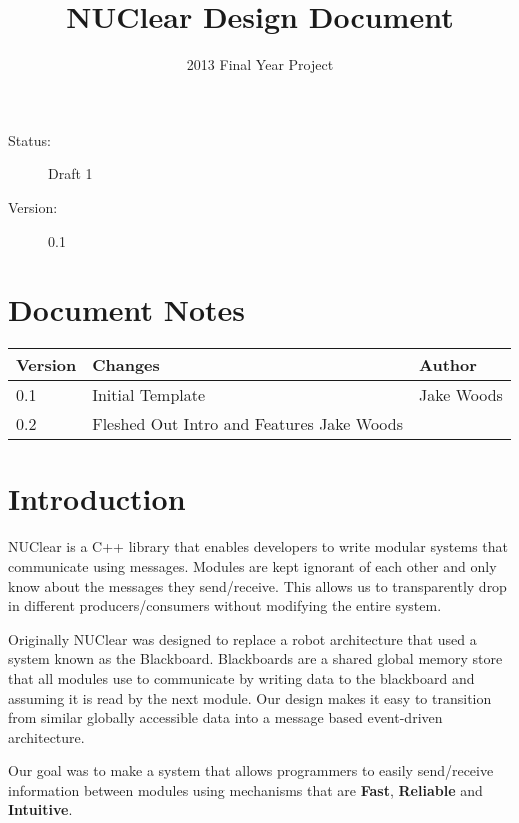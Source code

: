 \documentclass[english,12pt]{scrartcl}
\title{NUClear Design Document}
\author{2013 Final Year Project}
\begin{document}
	\maketitle
	\vfill
	{\large
		\begin{description}
			\item [Status:] Draft 1
			\item [Version:] 0.1
		\end{description}}

	\clearpage
	\tableofcontents

	\section{Document Notes}
		\begin{tabular}{ p{} | p{} | p{} }
			\textbf{Version} & \textbf{Changes} & \textbf{Author} \\
			\hline

			0.1 &
			Initial Template &
			Jake Woods \\
			\hline

			0.2 &
			Fleshed Out Intro and Features
			Jake Woods \\
			\hline
		\end{tabular}
		
	\clearpage
		
	\section{Introduction}
		NUClear is a C++ library that enables developers to write modular systems that communicate using messages. 
		Modules are kept ignorant of each other and only know about the messages they send/receive. 
		This allows us to transparently drop in different producers/consumers without modifying the entire system.
		
		Originally NUClear was designed to replace a robot architecture that used a system known as the Blackboard.
		Blackboards are a shared global memory store that all modules use to communicate by writing data to the blackboard and assuming it is read by the next module.
		Our design makes it easy to transition from similar globally accessible data into a message based event-driven architecture.
		
		Our goal was to make a system that allows programmers to easily send/receive information between modules using mechanisms that are \textbf{Fast}, \textbf{Reliable} and \textbf{Intuitive}.
\end{document}

